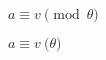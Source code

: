 \documentclass{sample}
\begin{document}
\begin{center}
$a \equiv v \pmod{\theta}$

$a \equiv v \pod{\theta}$
\end{center}
\end{document}

